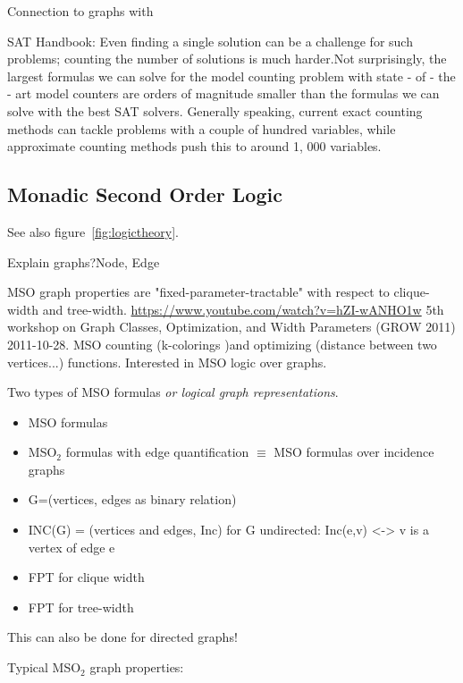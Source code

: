 \documentclass[a4paper, 12pt]{scrartcl}
\begin{document}
Connection to graphs with \cite{DiplomarbeitZisser}

SAT Handbook:
Even finding a single solution can be a challenge
for such problems; counting the number of solutions is much harder.Not
surprisingly, the largest formulas we can solve for the model counting problem
with state - of - the - art model counters are orders of magnitude smaller than the
formulas we can solve with the best SAT solvers. Generally speaking, current
exact counting methods can tackle problems with a couple of hundred variables, while approximate counting methods push this to around 1, 000 variables.

\subsection{Monadic Second Order Logic}
See also figure~\ref{fig:logictheory}.

Explain graphs?Node, Edge

MSO graph properties are "fixed-parameter-tractable" with respect to clique-width and tree-width. 
\url{https://www.youtube.com/watch?v=hZI-wANHO1w} 5th workshop on Graph Classes, Optimization, and Width Parameters (GROW 2011)
2011-10-28.
MSO counting (k-colorings )and optimizing (distance between two vertices...) functions.
Interested in MSO logic over graphs.

Two types of MSO formulas \textit{or logical graph representations}.
\begin{itemize}
	\item MSO formulas
	\item MSO$_{2}$ formulas with edge quantification $\equiv$ MSO formulas over incidence graphs
\end{itemize}
\begin{itemize}
	\item G=(vertices, edges as binary relation)
	\item INC(G) = (vertices and edges, Inc)
		for G undirected: Inc(e,v) <-> v is a vertex of edge e
\end{itemize}
\begin{itemize}
	\item FPT for clique width
	\item FPT for tree-width
\end{itemize}
This can also be done for directed graphs!

Typical MSO$_{2}$ graph properties:
\end{document}
